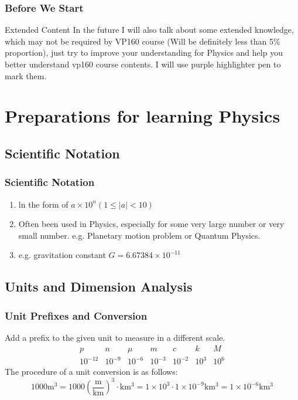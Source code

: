 \documentclass{beamer}
\begin{document}
\begin{frame}
    \frametitle{Before We Start}
    \begin{block}{Extended Content}
    In the future I will also talk about some extended knowledge, which may not be required by VP160 course (Will be definitely less than 5\% proportion), just 
    try to improve your understanding for Physics and help you better understand vp160 course contents. I will 
    use purple highlighter pen to mark them.
    \end{block}
    
    

    \end{frame}

\section{Preparations for learning Physics}
\subsection{Scientific Notation}
\begin{frame}
\frametitle{Scientific Notation}
\begin{enumerate}
    \item ln the form of $a \times 10^{n}(1 \leq|a|<10)$
    \item Often been used in Physics, especially for some very large number or very small number. e.g. Planetary motion problem or Quantum Physics.
    \item e.g. gravitation constant $G=6.67384 \times 10^{-11}$
\end{enumerate}

\end{frame}

\subsection{Units and Dimension Analysis}
\begin{frame}
    \frametitle{Unit Prefixes and Conversion}
    Add a prefix to the given unit to measure in a different scale.
    \[
    \begin{array}{ccccccc}
    p & n & \mu & m & c & k & M \\
    10^{-12} & 10^{-9} & 10^{-6} & 10^{-3} & 10^{-2} & 10^{3} & 10^{6}
    \end{array}
    \]
    The procedure of a unit conversion is as follows:
    \[
    1000 \mathrm{m^3} =1000 (\frac{\mathrm{m}}{\mathrm{km}})^3 \cdot \mathrm{km^3}
    =1 \times 10^3 \cdot 1 \times 10^{-9}\mathrm{km^3}=1 \times 10^{-6}\mathrm{km^3}
    \]
    
    \end{frame}
\end{document}
